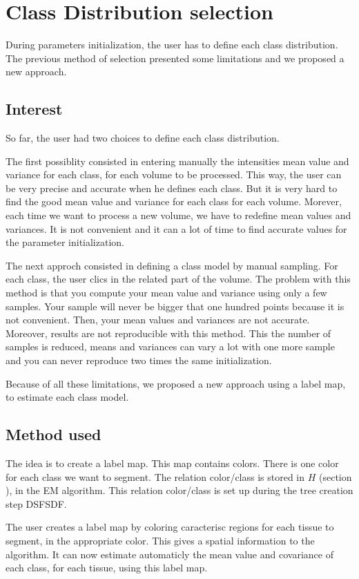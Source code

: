 %

\section{Class Distribution selection}\label{sec:CDS}
%
During parameters initialization, the user has to define each class distribution. The previous method of selection presented some limitations and we proposed a new approach.
%
\subsection{Interest}
%
So far, the user had two choices to define each class distribution. 
\par
The first possiblity consisted in entering manually the intensities mean value and variance for each class, for each volume to be processed. This way, the user can be very precise and accurate when he defines each class. But it is very hard to find the good mean value and variance for each class for each volume. Morever, each time we want to process a new volume, we have to redefine mean values and variances. It is not convenient and it can a lot of time to find accurate values for the parameter initialization. 
\par
The next approch consisted in defining a class model by manual sampling. For each class, the user clics in the related part of the volume. The problem with this method is that you compute your mean value and variance using only a few samples. Your sample will never be bigger that one hundred points because it is not convenient. Then, your mean values and variances are not accurate. Moreover, results are not reproducible with this method. This the number of samples is reduced, means and variances can vary a lot with one more sample and you can never reproduce two times the same initialization.
\par
Because of all these limitations,  we proposed a new approach using a label map, to estimate each class model.
%
\subsection{Method used}
%
The idea is to create a label map. This map contains colors. There is one color for each class we want to segment. The relation color/class is stored in $H$ (section ), in the EM algorithm. This relation color/class is set up during the tree creation step DSFSDF.
\par
The user creates a label map by coloring caracterisc regions for each tissue to segment, in the appropriate color. This gives a spatial information to the algorithm. It can now estimate automaticly the mean value and covariance of each class, for each tissue, using this label map.

